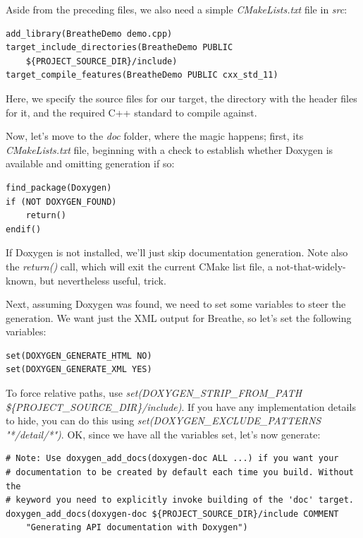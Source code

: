 Aside from the preceding files, we also need a simple \textit{CMakeLists.txt} file in \textit{src}:

\begin{lstlisting}[style=styleCMake]
add_library(BreatheDemo demo.cpp)
target_include_directories(BreatheDemo PUBLIC
	${PROJECT_SOURCE_DIR}/include)
target_compile_features(BreatheDemo PUBLIC cxx_std_11)

\end{lstlisting}

Here, we specify the source files for our target, the directory with the header files for it, and the required C++ standard to compile against.

Now, let's move to the \textit{doc} folder, where the magic happens; first, its \textit{CMakeLists.txt} file, beginning with a check to establish whether Doxygen is available and omitting generation if so:


\begin{lstlisting}[style=styleCMake]
find_package(Doxygen)
if (NOT DOXYGEN_FOUND)
	return()
endif()

\end{lstlisting}

If Doxygen is not installed, we'll just skip documentation generation. Note also the \textit{return()} call, which will exit the current CMake list file, a not-that-widely-known, but nevertheless useful, trick.

Next, assuming Doxygen was found, we need to set some variables to steer the generation. We want just the XML output for Breathe, so let's set the following variables:


\begin{lstlisting}[style=styleCMake]
set(DOXYGEN_GENERATE_HTML NO)
set(DOXYGEN_GENERATE_XML YES)
\end{lstlisting}

To force relative paths, use \textit{set(DOXYGEN\_STRIP\_FROM\_PATH \$\{PROJECT\_SOURCE\_DIR\}/include)}. If you have any implementation details to hide, you can do this using \textit{set(DOXYGEN\_EXCLUDE\_PATTERNS "*/detail/*")}. OK, since we have all the variables set, let's now generate:


\begin{lstlisting}[style=styleCMake]
# Note: Use doxygen_add_docs(doxygen-doc ALL ...) if you want your
# documentation to be created by default each time you build. Without the 
# keyword you need to explicitly invoke building of the 'doc' target.
doxygen_add_docs(doxygen-doc ${PROJECT_SOURCE_DIR}/include COMMENT
	"Generating API documentation with Doxygen")

\end{lstlisting}

